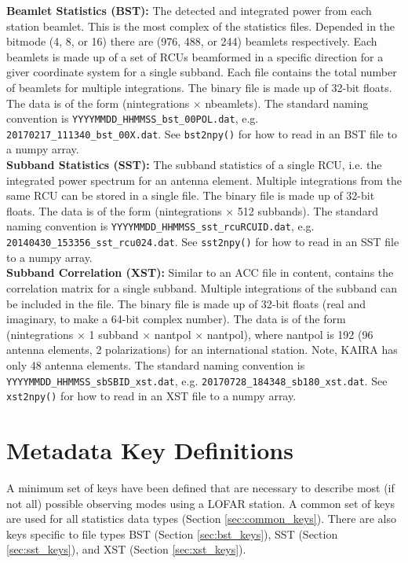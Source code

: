 \documentclass[10pt,a4paper]{article}
\begin{document}
\noindent\textbf{Beamlet Statistics (BST):} The detected and integrated power
from each station beamlet. This is the most complex of the statistics files.
Depended in the bitmode (4, 8, or 16) there are (976, 488, or 244) beamlets
respectively. Each beamlets is made up of a set of RCUs beamformed in a specific
direction for a giver coordinate system for a single subband. Each file contains
the total number of beamlets for multiple integrations. The binary file is made
up of 32-bit floats. The data is of the form (nintegrations $\times$ nbeamlets).
The standard naming convention is \texttt{YYYYMMDD\_HHMMSS\_bst\_00POL.dat}, e.g.
\texttt{20170217\_111340\_bst\_00X.dat}.  See \texttt{bst2npy()} for how to read in
an BST file to a numpy array.
\\

\noindent\textbf{Subband Statistics (SST):} The subband statistics of a single
RCU, i.e. the integrated power spectrum for an antenna element. Multiple
integrations from the same RCU can be stored in a single file. The binary file
is made up of 32-bit floats. The data is of the form (nintegrations $\times$ 512
subbands). The standard naming convention is
\texttt{YYYYMMDD\_HHMMSS\_sst\_rcuRCUID.dat}, e.g.
\texttt{20140430\_153356\_sst\_rcu024.dat}.  See \texttt{sst2npy()} for how to
read in an SST file to a numpy array.
\\

\noindent\textbf{Subband Correlation (XST):} Similar to an ACC file in content,
contains the correlation matrix for a single subband. Multiple integrations of
the subband can be included in the file. The binary file is made up of 32-bit
floats (real and imaginary, to make a 64-bit complex number). The data is of the
form (nintegrations $\times$ 1 subband $\times$ nantpol $\times$ nantpol), where
nantpol is 192 (96 antenna elements, 2 polarizations) for an international
station. Note, KAIRA has only 48 antenna elements.  The standard naming
convention is \texttt{YYYYMMDD\_HHMMSS\_sbSBID\_xst.dat}, e.g.
\texttt{20170728\_184348\_sb180\_xst.dat}.  See \texttt{xst2npy()} for how to
read in an XST file to a numpy array.
\\

\section{Metadata Key Definitions}

A minimum set of keys have been defined that are necessary to describe most (if
not all) possible observing modes using a LOFAR station. A common set of keys
are used for all statistics data types (Section \ref{sec:common_keys}). There
are also keys specific to file types BST (Section \ref{sec:bst_keys}), SST
(Section \ref{sec:sst_keys}), and XST (Section \ref{sec:xst_keys}).
\end{document}
